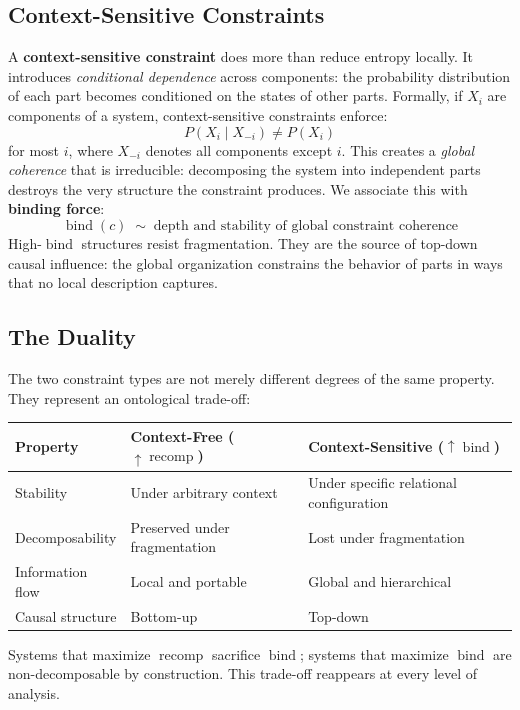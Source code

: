 \documentclass[11pt]{article}
\newcommand{\bind}{\operatorname{bind}}
\newcommand{\recomp}{\operatorname{recomp}}
\begin{document}
\subsection{Context-Sensitive Constraints}

A \textbf{context-sensitive constraint} does more than reduce entropy locally. It
introduces \emph{conditional dependence} across components: the probability distribution
of each part becomes conditioned on the states of other parts. Formally, if $X_i$ are
components of a system, context-sensitive constraints enforce:
\[
P(X_i \mid X_{-i}) \neq P(X_i)
\]
for most $i$, where $X_{-i}$ denotes all components except $i$. This creates a
\emph{global coherence} that is irreducible: decomposing the system into independent parts
destroys the very structure the constraint produces. We associate this with
\textbf{binding force}:
\[
\bind(c) \;\sim\; \text{depth and stability of global constraint coherence}
\]
High-$\bind$ structures resist fragmentation. They are the source of top-down causal
influence: the global organization constrains the behavior of parts in ways that no
local description captures.

\subsection{The Duality}

The two constraint types are not merely different degrees of the same property. They
represent an ontological trade-off:

\begin{center}
\begin{tabular}{@{}lll@{}}
\toprule
\textbf{Property} & \textbf{Context-Free ($\uparrow\recomp$)} & \textbf{Context-Sensitive ($\uparrow\bind$)} \\
\midrule
Stability & Under arbitrary context & Under specific relational configuration \\
Decomposability & Preserved under fragmentation & Lost under fragmentation \\
Information flow & Local and portable & Global and hierarchical \\
Causal structure & Bottom-up & Top-down \\
\bottomrule
\end{tabular}
\end{center}

\noindent
Systems that maximize $\recomp$ sacrifice $\bind$; systems that maximize $\bind$ are
non-decomposable by construction. This trade-off reappears at every level of analysis.
\end{document}
